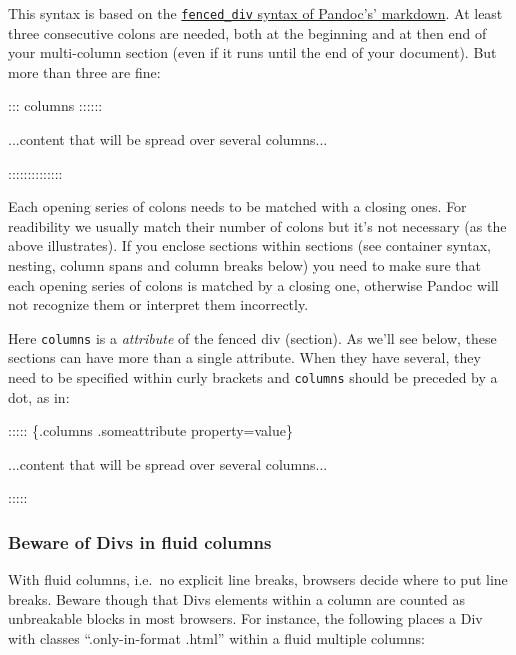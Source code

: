 \documentclass[
]{article}
\newenvironment{Shaded}{}{}
\newcommand{\NormalTok}[1]{#1}
\begin{document}
This syntax is based on the
\href{https://pandoc.org/MANUAL.html\#divs-and-spans}{\texttt{fenced\_div}
syntax of Pandoc's' markdown}. At least three consecutive colons are
needed, both at the beginning and at then end of your multi-column
section (even if it runs until the end of your document). But more than
three are fine:

\begin{Shaded}
\begin{Highlighting}[]
\NormalTok{::: columns ::::::}

\NormalTok{...content that will be spread over several columns...}

\NormalTok{::::::::::::::}
\end{Highlighting}
\end{Shaded}

Each opening series of colons needs to be matched with a closing ones.
For readibility we usually match their number of colons but it's not
necessary (as the above illustrates). If you enclose sections within
sections (see container syntax, nesting, column spans and column breaks
below) you need to make sure that each opening series of colons is
matched by a closing one, otherwise Pandoc will not recognize them or
interpret them incorrectly.

Here \texttt{columns} is a \emph{attribute} of the fenced div (section).
As we'll see below, these sections can have more than a single
attribute. When they have several, they need to be specified within
curly brackets and \texttt{columns} should be preceded by a dot, as in:

\begin{Shaded}
\begin{Highlighting}[]
\NormalTok{::::: \{.columns .someattribute property=value\}}

\NormalTok{...content that will be spread over several columns...}

\NormalTok{:::::}
\end{Highlighting}
\end{Shaded}

\hypertarget{beware-of-divs-in-fluid-columns}{%
\subsubsection{Beware of Divs in fluid
columns}\label{beware-of-divs-in-fluid-columns}}

With fluid columns, i.e.~no explicit line breaks, browsers decide where
to put line breaks. Beware though that Divs elements within a column are
counted as unbreakable blocks in most browsers. For instance, the
following places a Div with classes ``.only-in-format .html'' within a
fluid multiple columns:
\end{document}
